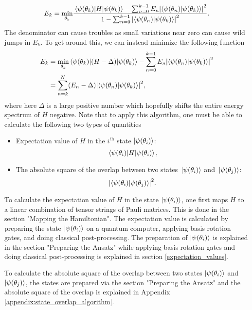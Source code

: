 \documentclass[10pt]{article}
\begin{document}
\begin{align}
E_k=\underset{\theta_k}{\min}\frac{\mel{\psi(\theta_k)}{H}{\psi(\theta_k)}-\sum_{n=0}^{k-1}E_n\abs{\bra{\psi(\theta_n)}\ket{\psi(\theta_k)}}^2}{1-\sum_{n=0}^{k-1}\abs{\bra{\psi(\theta_n)}\ket{\psi(\theta_k)}}^2}.
\end{align}
The denominator can cause troubles as small variations near zero can cause wild jumps in $E_k$. To get around this, we can instead minimize the following function
\begin{align}
\label{excited_alt}
E_k
&=
\underset{\theta_k}{\min}\mel{\psi(\theta_k)}{(H-\Delta)}{\psi(\theta_k)}-\sum_{n=0}^{k-1}E_n\abs{\bra{\psi(\theta_n)}\ket{\psi(\theta_k)}}^2
\\
&=
\sum_{n=k}^{N}(E_n-\Delta)\abs{\bra{\psi(\theta_n)}\ket{\psi(\theta_k)}}^2,
\end{align}
where here $\Delta$ is a large positive number which hopefully shifts the entire energy spectrum of $H$ negative. Note that to apply this algorithm, one must be able to calculate the following two types of quantities
\begin{itemize}
    \item Expectation value of $H$ in the $i^{\text{th}}$ state $\ket{\psi(\theta_i)}$: 
    \begin{align}
    \mel{\psi(\theta_i)}{H}{\psi(\theta_i)},    
    \end{align}
    \item The absolute square of the overlap between two states $\ket*{\psi(\theta_i)}$ and $\ket*{\psi(\theta_j)}$:
    \begin{align}
    \abs{\bra{\psi(\theta_i)}\ket{\psi(\theta_j)}}^2.
    \end{align}
\end{itemize}

To calculate the expectation value of $H$ in the state $\ket{\psi(\theta_i)}$, one first maps $H$ to a linear combination of tensor strings of Pauli matrices. This is done in the section "Mapping the Hamiltonian". The expectation value is calculated by preparing the state $\ket{\psi(\theta_i)}$ on a quantum computer, applying basis rotation gates, and doing classical post-processing. The preparation  of $\ket{\psi(\theta_i)}$ is explained in the section "Preparing the Ansatz"  while applying basis rotation gates and doing classical post-processing is explained in section \ref{expectation_values}.

To calculate the absolute square of the overlap between two states $\ket{\psi(\theta_i)}$ and $\ket{\psi(\theta_j)}$, the states are prepared via the section "Preparing the Ansatz" and the absolute square of the overlap is explained in Appendix \ref{appendix:state_overlap_algorithm}.
\end{document}
